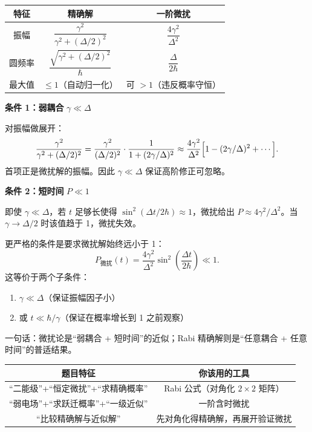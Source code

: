 \begin{formulabox}
\begin{center}
\begin{tabular}{ccc}
\hline
特征 & 精确解 & 一阶微扰 \\
\hline
振幅 & $\dfrac{\gamma^2}{\gamma^2 + (\Delta/2)^2}$ & $\dfrac{4\gamma^2}{\Delta^2}$ \\[6pt]
圆频率 & $\dfrac{\sqrt{\gamma^2 + (\Delta/2)^2}}{\hbar}$ & $\dfrac{\Delta}{2\hbar}$ \\[6pt]
最大值 & $\leq 1$（自动归一化） & 可 $>1$（违反概率守恒） \\
\hline
\end{tabular}
\end{center}
\end{formulabox}

\begin{derivationbox}[适用条件的严格推导]
\textbf{条件 1：弱耦合} $\gamma \ll \Delta$

对振幅做展开：
\[
\frac{\gamma^2}{\gamma^2 + (\Delta/2)^2} = \frac{\gamma^2}{(\Delta/2)^2} \cdot \frac{1}{1 + (2\gamma/\Delta)^2} \approx \frac{4\gamma^2}{\Delta^2} \Bigl[ 1 - (2\gamma/\Delta)^2 + \cdots \Bigr].
\]
首项正是微扰解的振幅。因此 $\gamma \ll \Delta$ 保证高阶修正可忽略。

\textbf{条件 2：短时间} $P \ll 1$

即使 $\gamma \ll \Delta$，若 $t$ 足够长使得 $\sin^2(\Delta t/2\hbar) \approx 1$，微扰给出 $P \approx 4\gamma^2/\Delta^2$。当 $\gamma \to \Delta/2$ 时该值趋于 1，微扰失效。

更严格的条件是要求微扰解始终远小于 1：
\[
P_{\text{微扰}}(t) = \frac{4\gamma^2}{\Delta^2} \sin^2\!\left( \frac{\Delta t}{2\hbar} \right) \ll 1.
\]
这等价于两个子条件：
\begin{enumerate}
\item $\gamma \ll \Delta$（保证振幅因子小）
\item 或 $t \ll \hbar/\gamma$（保证在概率增长到 1 之前观察）
\end{enumerate}

一句话：微扰论是``弱耦合 + 短时间''的近似；Rabi 精确解则是``任意耦合 + 任意时间''的普适结果。
\end{derivationbox}

\begin{cheatbox}
\begin{center}
\begin{tabular}{cc}
\hline
题目特征 & 你该用的工具 \\
\hline
``二能级''+``恒定微扰''+``求精确概率'' & Rabi 公式（对角化 $2\times 2$ 矩阵） \\
``弱电场''+``求跃迁概率''+``一级近似'' & 一阶含时微扰 \\
``比较精确解与近似解'' & 先对角化得精确解，再展开验证微扰 \\
\hline
\end{tabular}
\end{center}
\end{cheatbox}
